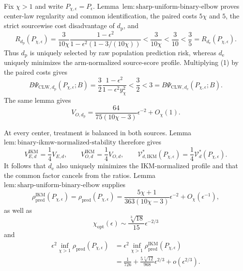 Fix \(\chi>1\) and write \(P_{\chi,\epsilon}=P_\epsilon\). Lemma~\(\mathrm{lem{:}sharp\text{-}uniform\text{-}binary\text{-}elbow}\) proves center-law regularity and common identification, the paired costs \(5\chi\) and \(5\), the strict sourcewise cost disadvantage of \(d_{\mathrm p}\), and
\[
 R_{d_{\mathrm p}}(P_{\chi,\epsilon})
 =\frac{3}{10\chi}\frac{1-\epsilon^2}{1-\epsilon^2(1-3/(10\chi))}
 <\frac{3}{10\chi}<\frac3{10}<\frac35
 =R_{d_{\mathrm e}}(P_{\chi,\epsilon}). \tag{1}
\]
Thus \(d_{\mathrm p}\) is uniquely selected by raw population prediction risk, whereas \(d_{\mathrm e}\) uniquely minimizes the arm-normalized source-score profile. Multiplying (1) by the paired costs gives
\[
 B\Psi_{\mathrm{CLW},d_{\mathrm p}}(P_{\chi,\epsilon};B)
 =\frac32\frac{1-\epsilon^2}{1-\epsilon^2y_\chi^2}<\frac32<3
 =B\Psi_{\mathrm{CLW},d_{\mathrm e}}(P_{\chi,\epsilon};B). \tag{2}
\]
The same lemma gives
\[
 V_{O,d_{\mathrm p}}
 =\frac{64}{75(10\chi-3)}\epsilon^{-2}+O_\chi(1). \tag{3}
\]

At every center, treatment is balanced in both sources. Lemma~\(\mathrm{lem{:}binary\text{-}ikmw\text{-}normalized\text{-}stability}\) therefore gives
\[
 V_{E,d}^{\mathrm{IKM}}=\frac14V_{E,d},
 \qquad V_{O,d}^{\mathrm{IKM}}=\frac14V_{O,d},
 \qquad
 \mathcal V_{d,\mathrm{IKM}}^*(P_{\chi,\epsilon})
 =\frac14\mathcal V_d^*(P_{\chi,\epsilon}). \tag{4}
\]
It follows that \(d_{\mathrm e}\) also uniquely minimizes the IKM-normalized profile and that the common factor cancels from the ratios. Lemma~\(\mathrm{lem{:}sharp\text{-}uniform\text{-}binary\text{-}elbow}\) supplies
\[
 \rho_{\mathrm{pred}}^{\mathrm{IKM}}(P_{\chi,\epsilon})
 =\rho_{\mathrm{pred}}(P_{\chi,\epsilon})
 =\frac{5\chi+1}{363(10\chi-3)}\epsilon^{-2}+O_\chi(\epsilon^{-1}), \tag{5}
\]
as well as
\[
 \chi_{\mathrm{opt}}(\epsilon)
 \sim\frac{\sqrt[3]{18}}{15}\epsilon^{-2/3} \tag{6}
\]
and
\[
\begin{aligned}
 \epsilon^2\inf_{\chi>1}\rho_{\mathrm{pred}}(P_{\chi,\epsilon})
 &=\epsilon^2\inf_{\chi>1}\rho_{\mathrm{pred}}^{\mathrm{IKM}}(P_{\chi,\epsilon})\\
 &=\frac1{726}+\frac{5\sqrt[3]{12}}{968}\epsilon^{2/3}+o(\epsilon^{2/3}). \tag{7}
\end{aligned}
\]

